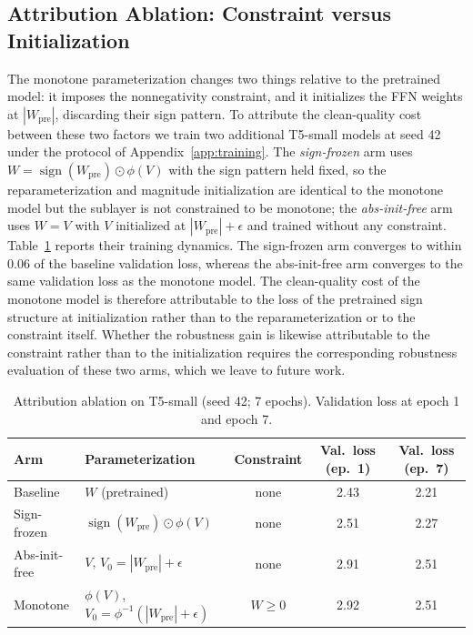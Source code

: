 \documentclass{article}
\theoremstyle{plain}
\theoremstyle{definition}
\theoremstyle{remark}
\begin{document}
\subsection{Attribution Ablation: Constraint versus Initialization}
\label{app:ablation}
The monotone parameterization changes two things relative to the pretrained model: it imposes the nonnegativity constraint, and it initializes the FFN weights at $|W_{\mathrm{pre}}|$, discarding their sign pattern. To attribute the clean-quality cost between these two factors we train two additional T5-small models at seed 42 under the protocol of Appendix~\ref{app:training}. The \emph{sign-frozen} arm uses $W = \operatorname{sign}(W_{\mathrm{pre}}) \odot \phi(V)$ with the sign pattern held fixed, so the reparameterization and magnitude initialization are identical to the monotone model but the sublayer is not constrained to be monotone; the \emph{abs-init-free} arm uses $W = V$ with $V$ initialized at $|W_{\mathrm{pre}}| + \epsilon$ and trained without any constraint. Table~\ref{tab:ablation} reports their training dynamics. The sign-frozen arm converges to within 0.06 of the baseline validation loss, whereas the abs-init-free arm converges to the same validation loss as the monotone model. The clean-quality cost of the monotone model is therefore attributable to the loss of the pretrained sign structure at initialization rather than to the reparameterization or to the constraint itself. Whether the robustness gain is likewise attributable to the constraint rather than to the initialization requires the corresponding robustness evaluation of these two arms, which we leave to future work.

\begin{table}[h]
\caption{Attribution ablation on T5-small (seed 42; 7 epochs). Validation loss at epoch 1 and epoch 7.}
\label{tab:ablation}
\vskip 0.1in
\begin{center}
\begin{small}
\begin{tabular}{llccc}
\toprule
Arm & Parameterization & Constraint & Val.\ loss (ep.\ 1) & Val.\ loss (ep.\ 7) \\
\midrule
Baseline & $W$ (pretrained) & none & 2.43 & 2.21 \\
Sign-frozen & $\operatorname{sign}(W_{\mathrm{pre}}) \odot \phi(V)$ & none & 2.51 & 2.27 \\
Abs-init-free & $V$, $V_0 = |W_{\mathrm{pre}}| + \epsilon$ & none & 2.91 & 2.51 \\
Monotone & $\phi(V)$, $V_0 = \phi^{-1}(|W_{\mathrm{pre}}| + \epsilon)$ & $W \ge 0$ & 2.92 & 2.51 \\
\bottomrule
\end{tabular}
\end{small}
\end{center}
\vskip -0.1in
\end{table}
\end{document}
